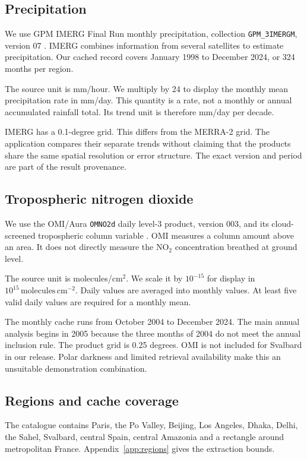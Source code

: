 \documentclass[10pt,a4paper,twocolumn]{article}
\newcommand{\unitno}{\ensuremath{10^{15}\,\mathrm{molecules\,cm^{-2}}}}
\newcommand{\code}[1]{\texttt{#1}}
\begin{document}
\subsection{Precipitation}
We use GPM IMERG Final Run monthly precipitation, collection \code{GPM\_3IMERGM}, version 07 \cite{imerg}. IMERG combines information from several satellites to estimate precipitation. Our cached record covers January 1998 to December 2024, or 324 months per region.

The source unit is mm/hour. We multiply by 24 to display the monthly mean precipitation rate in mm/day. This quantity is a rate, not a monthly or annual accumulated rainfall total. Its trend unit is therefore mm/day per decade.

IMERG has a 0.1-degree grid. This differs from the MERRA-2 grid. The application compares their separate trends without claiming that the products share the same spatial resolution or error structure. The exact version and period are part of the result provenance.

\subsection{Tropospheric nitrogen dioxide}
We use the OMI/Aura \code{OMNO2d} daily level-3 product, version 003, and its cloud-screened tropospheric column variable \cite{omi}. OMI measures a column amount above an area. It does not directly measure the NO$_2$ concentration breathed at ground level.

The source unit is molecules/cm$^2$. We scale it by $10^{-15}$ for display in \unitno. Daily values are averaged into monthly values. At least five valid daily values are required for a monthly mean.

The monthly cache runs from October 2004 to December 2024. The main annual analysis begins in 2005 because the three months of 2004 do not meet the annual inclusion rule. The product grid is 0.25 degrees. OMI is not included for Svalbard in our release. Polar darkness and limited retrieval availability make this an unsuitable demonstration combination.

\subsection{Regions and cache coverage}
The catalogue contains Paris, the Po Valley, Beijing, Los Angeles, Dhaka, Delhi, the Sahel, Svalbard, central Spain, central Amazonia and a rectangle around metropolitan France. Appendix~\ref{app:regions} gives the extraction bounds.
\end{document}

